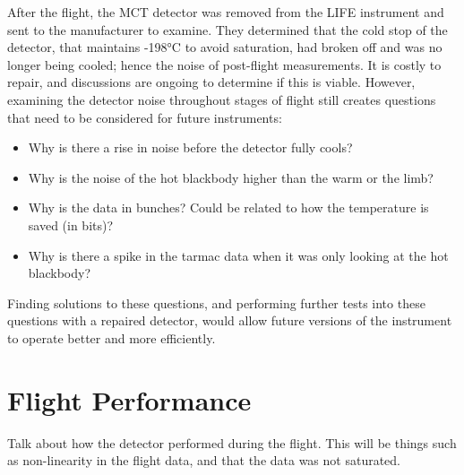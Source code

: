 After the flight, the MCT detector was removed from the LIFE instrument and sent to the manufacturer to examine. They determined that the cold stop of the detector, that maintains -198°C to avoid saturation, had broken off and was no longer being cooled; hence the noise of post-flight measurements. It is costly to repair, and discussions are ongoing to determine if this is viable. However, examining the detector noise throughout stages of flight still creates questions that need to be considered for future instruments:
\begin{itemize}
    \item Why is there a rise in noise before the detector fully cools?
    \item Why is the noise of the hot blackbody higher than the warm or the limb?
    \item Why is the data in bunches? Could be related to how the temperature is saved (in bits)?
    \item Why is there a spike in the tarmac data when it was only looking at the hot blackbody?
\end{itemize}
Finding solutions to these questions, and performing further tests into these questions with a repaired detector, would allow future versions of the instrument to operate better and more efficiently.

\section{Flight Performance}\label{detector_flight_performance}
Talk about how the detector performed during the flight. This will be things such as non-linearity in the flight data, and that the data was not saturated.